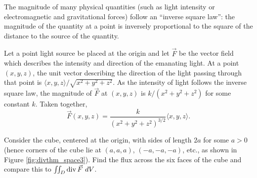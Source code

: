 
{The magnitude of many physical quantities (such as light intensity or electromagnetic and gravitational forces) follow an ``inverse square law'': the magnitude of the quantity at a point is inversely proportional to the square of the distance to the source of the quantity. 

Let a point light source be placed at the origin and let $\vec F$ be the vector field which describes the intensity and direction of the emanating light. At a point $(x,y,z)$, the unit vector describing the direction of the light passing through that point is $\langle x,y,z\rangle/\sqrt{x^2+y^2+z^2}$. As the intensity of light follows the inverse square law, the magnitude of $\vec F$ at $(x,y,z)$ is $k/(x^2+y^2+z^2)$ for some constant $k$. Taken together, 
$$\vec F(x,y,z) = \frac{k}{(x^2+y^2+z^2)^{3/2}}\langle x,y,z\rangle.$$

Consider the cube, centered at the origin, with sides of length $2a$ for some $a>0$ (hence corners of the cube lie at $(a,a,a)$, $(-a,-a,-a)$, etc., as shown in Figure \ref{fig:divthm_space3}). Find the flux across the six faces of the cube and compare this to $\iint_D \operatorname{div}\vec F\ dV$.
}
